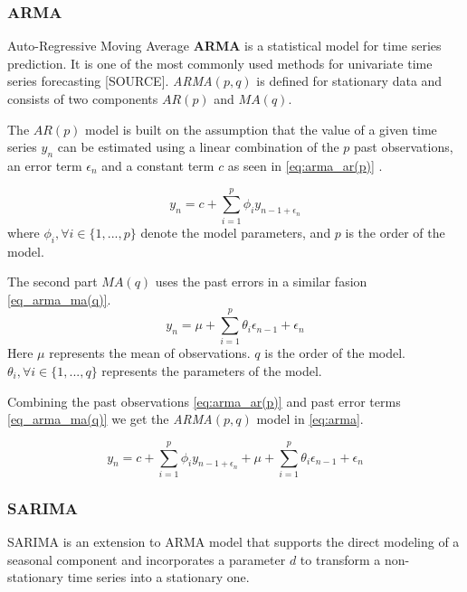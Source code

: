 
\subsubsection{ARMA}
Auto-Regressive Moving Average \textbf{ARMA} is a statistical model for time series prediction. It is one of the most commonly used methods for univariate time series forecasting [SOURCE].
\textit{ARMA}$(p, q)$ is defined for stationary data and consists of two components $AR(p)$ and $MA(q)$.

The $AR(p)$ model is built on the assumption that the value of a given time series $y_n$ can be estimated using a linear combination
of the $p$ past observations, an error term $\epsilon_n$ and a constant term $c$ as seen in \autoref{eq:arma_ar(p)} \cite{Box2016}.

\begin{equation}
    \label{eq:arma_ar(p)}
    y_n = c + \sum_{i=1}^{p} \phi_i y_{n-1 + \epsilon_n}
\end{equation}
  where $\phi_i, \forall i \in \{1, ..., p\} $ denote the model parameters, and $p$ is the order of the model.

The second part $MA(q)$ uses the past errors in a similar fasion \autoref{eq_arma_ma(q)}.
\begin{equation}
    \label{eq_arma_ma(q)}
    y_n = \mu + \sum_{i=1}^{p} \theta_i \epsilon_{n-1} + \epsilon_n
\end{equation}
Here $\mu$ represents the mean of observations. $q$ is the order of the model. $\theta_i, \forall i \in \{1, ..., q\}$ represents the parameters of the model.

Combining the past observations \autoref{eq:arma_ar(p)} and past error terms \autoref{eq_arma_ma(q)} we get the \textit{ARMA}$(p,q)$ model in \autoref{eq:arma}.

\begin{equation}
    \label{eq:arma}
    y_n = c + \sum_{i=1}^{p} \phi_i y_{n-1 + \epsilon_n} + \mu + \sum_{i=1}^{p} \theta_i \epsilon_{n-1} + \epsilon_n
\end{equation}

\subsubsection{SARIMA}
SARIMA is an extension to ARMA model that supports the direct modeling of a seasonal component and incorporates a parameter $d$
to transform a non-stationary time series into a stationary one.

